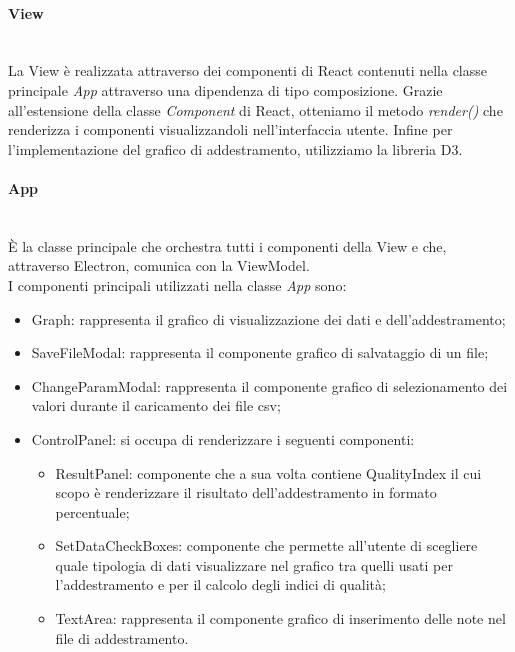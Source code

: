 		\paragraph{View} \mbox{} \\[1mm]
		La View è realizzata attraverso dei componenti di React contenuti nella classe principale \textit{App} attraverso una dipendenza di tipo composizione. Grazie all'estensione della classe \textit{Component} di React, otteniamo il metodo \textit{render()} che renderizza i componenti visualizzandoli nell'interfaccia utente.
		Infine per l'implementazione del grafico di addestramento, utilizziamo la libreria D3.
		\paragraph*{App} \mbox{} \\[1mm]
		È la classe principale che orchestra tutti i componenti della View e che, attraverso Electron, comunica con la ViewModel. \\
		I componenti principali utilizzati nella classe \textit{App} sono:
		\begin{itemize}
			\item Graph: rappresenta il grafico di visualizzazione dei dati e dell'addestramento;
			\item SaveFileModal: rappresenta il componente grafico di salvataggio di un file;
			\item ChangeParamModal: rappresenta il componente grafico di selezionamento dei valori durante il caricamento dei file csv;
			\item ControlPanel: si occupa di renderizzare i seguenti componenti: \begin{itemize}
				\item ResultPanel: componente che a sua volta contiene QualityIndex il cui scopo è renderizzare il risultato dell'addestramento in formato percentuale;
				\item SetDataCheckBoxes: componente che permette all'utente di scegliere quale tipologia di dati visualizzare nel grafico tra quelli usati per l'addestramento e per il calcolo degli indici di qualità;
				\item TextArea: rappresenta il componente grafico di inserimento delle note nel file di addestramento.
			\end{itemize}
		\end{itemize}
